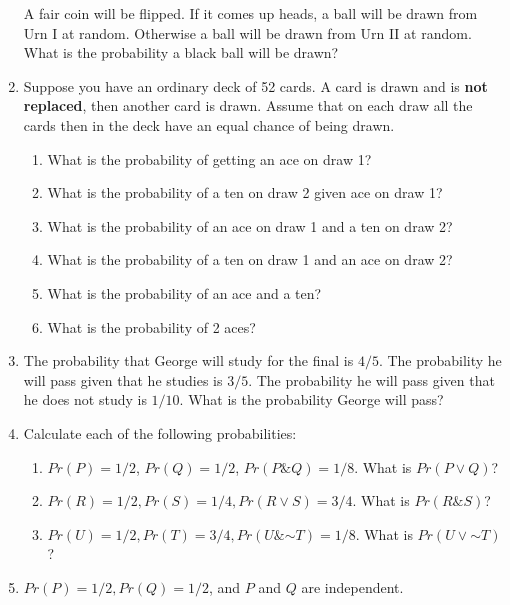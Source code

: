 \documentclass[justified]{tufte-book}
\providecommand{\tightlist}{%
  \setlength{\itemsep}{0pt}\setlength{\parskip}{0pt}}
\renewcommand{\neg}{\mathbin{\sim}}
\renewcommand{\wedge}{\mathbin{\&}}
\theoremstyle{definition}
\theoremstyle{definition}
\theoremstyle{definition}
\theoremstyle{definition}
\theoremstyle{remark}
\begin{document}
\begin{enumerate}
  A fair coin will be flipped. If it comes up heads, a ball will be drawn from Urn I at random. Otherwise a ball will be drawn from Urn II at random. What is the probability a black ball will be drawn?
\item
  Suppose you have an ordinary deck of 52 cards. A card is drawn and is \textbf{not replaced}, then another card is drawn. Assume that on each draw all the cards then in the deck have an equal chance of being drawn.

  \begin{enumerate}
  \def\labelenumii{\alph{enumii}.}
  \tightlist
  \item
    What is the probability of getting an ace on draw 1?
  \item
    What is the probability of a ten on draw 2 given ace on draw 1?
  \item
    What is the probability of an ace on draw 1 and a ten on draw 2?
  \item
    What is the probability of a ten on draw 1 and an ace on draw 2?
  \item
    What is the probability of an ace and a ten?
  \item
    What is the probability of 2 aces?
  \end{enumerate}
\item
  The probability that George will study for the final is \(4/5\). The probability he will pass given that he studies is \(3/5\). The probability he will pass given that he does not study is \(1/10\). What is the probability George will pass?
\item
  Calculate each of the following probabilities:

  \begin{enumerate}
  \def\labelenumii{\alph{enumii}.}
  \tightlist
  \item
    \(Pr(P) = 1/2\), \(Pr(Q) = 1/2\), \(Pr(P \wedge Q) = 1/8\). What is \(Pr(P \vee Q)\)?
  \item
    \(Pr(R) = 1/2, Pr(S) = 1/4, Pr(R \vee S) = 3/4\). What is \(Pr(R \wedge S)\)?
  \item
    \(Pr(U) = 1/2, Pr(T) = 3/4, Pr(U \wedge \neg T) = 1/8\). What is \(Pr(U \vee \neg T)\)?
  \end{enumerate}
\item
  \(Pr(P) = 1/2, Pr(Q) = 1/2\), and \(P\) and \(Q\) are independent.


\end{enumerate}
\end{document}
